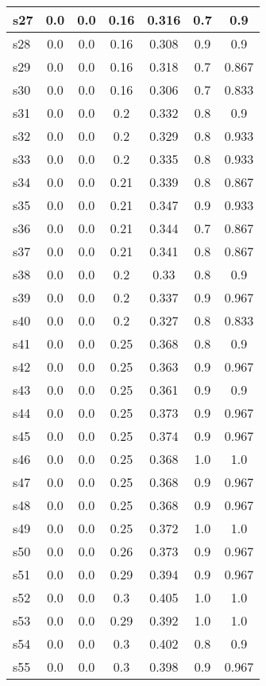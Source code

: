 \documentclass{article}
\begin{document}
\begin{tabular}{|l|c|c|c|c|c|c|}
\hline
s27 &0.0 & 0.0 & 0.16 & 0.316 & 0.7 & 0.9\\
\hline
s28 &0.0 & 0.0 & 0.16 & 0.308 & 0.9 & 0.9\\
\hline
s29 &0.0 & 0.0 & 0.16 & 0.318 & 0.7 & 0.867\\
\hline
s30 &0.0 & 0.0 & 0.16 & 0.306 & 0.7 & 0.833\\
\hline
s31 &0.0 & 0.0 & 0.2 & 0.332 & 0.8 & 0.9\\
\hline
s32 &0.0 & 0.0 & 0.2 & 0.329 & 0.8 & 0.933\\
\hline
s33 &0.0 & 0.0 & 0.2 & 0.335 & 0.8 & 0.933\\
\hline
s34 &0.0 & 0.0 & 0.21 & 0.339 & 0.8 & 0.867\\
\hline
s35 &0.0 & 0.0 & 0.21 & 0.347 & 0.9 & 0.933\\
\hline
s36 &0.0 & 0.0 & 0.21 & 0.344 & 0.7 & 0.867\\
\hline
s37 &0.0 & 0.0 & 0.21 & 0.341 & 0.8 & 0.867\\
\hline
s38 &0.0 & 0.0 & 0.2 & 0.33 & 0.8 & 0.9\\
\hline
s39 &0.0 & 0.0 & 0.2 & 0.337 & 0.9 & 0.967\\
\hline
s40 &0.0 & 0.0 & 0.2 & 0.327 & 0.8 & 0.833\\
\hline
s41 &0.0 & 0.0 & 0.25 & 0.368 & 0.8 & 0.9\\
\hline
s42 &0.0 & 0.0 & 0.25 & 0.363 & 0.9 & 0.967\\
\hline
s43 &0.0 & 0.0 & 0.25 & 0.361 & 0.9 & 0.9\\
\hline
s44 &0.0 & 0.0 & 0.25 & 0.373 & 0.9 & 0.967\\
\hline
s45 &0.0 & 0.0 & 0.25 & 0.374 & 0.9 & 0.967\\
\hline
s46 &0.0 & 0.0 & 0.25 & 0.368 & 1.0 & 1.0\\
\hline
s47 &0.0 & 0.0 & 0.25 & 0.368 & 0.9 & 0.967\\
\hline
s48 &0.0 & 0.0 & 0.25 & 0.368 & 0.9 & 0.967\\
\hline
s49 &0.0 & 0.0 & 0.25 & 0.372 & 1.0 & 1.0\\
\hline
s50 &0.0 & 0.0 & 0.26 & 0.373 & 0.9 & 0.967\\
\hline
s51 &0.0 & 0.0 & 0.29 & 0.394 & 0.9 & 0.967\\
\hline
s52 &0.0 & 0.0 & 0.3 & 0.405 & 1.0 & 1.0\\
\hline
s53 &0.0 & 0.0 & 0.29 & 0.392 & 1.0 & 1.0\\
\hline
s54 &0.0 & 0.0 & 0.3 & 0.402 & 0.8 & 0.9\\
\hline
s55 &0.0 & 0.0 & 0.3 & 0.398 & 0.9 & 0.967\\

\end{tabular}
\end{document}
